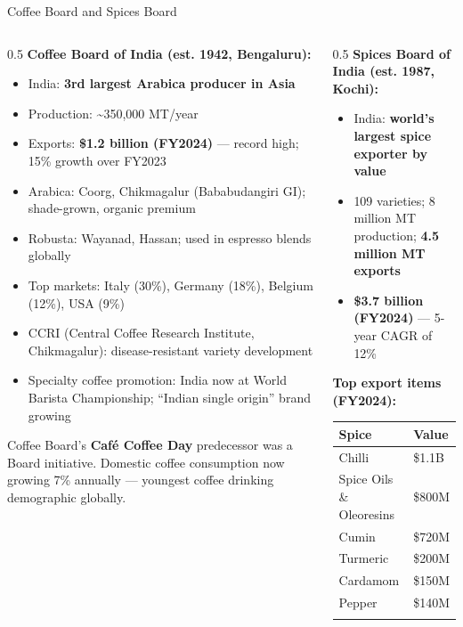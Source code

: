 \documentclass[
  ignorenonframetext,
  aspectratio=169,
]{beamer}
\makeatletter
\providecommand{\tightlist}{%
  \setlength{\itemsep}{0pt}\setlength{\parskip}{0pt}}
\let\quarto@originallabel\label
\DeclareRobustCommand*{\label}[1]{\quarto@originallabel{#1}}
\makeatother
\begin{document}
\begin{frame}{Coffee Board and Spices Board}
\label{coffee-board-and-spices-board}
\begin{columns}[T]
\begin{column}{0.5\linewidth}
\textbf{Coffee Board of India (est. 1942, Bengaluru):}

\begin{itemize}
\tightlist
\item
  India: \textbf{3rd largest Arabica producer in Asia}
\item
  Production: \textasciitilde350,000 MT/year
\item
  Exports: \textbf{\$1.2 billion (FY2024)} --- record high; 15\% growth
  over FY2023
\item
  {Arabica}: Coorg, Chikmagalur (Bababudangiri GI); shade-grown, organic
  premium
\item
  {Robusta}: Wayanad, Hassan; used in espresso blends globally
\item
  Top markets: Italy (30\%), Germany (18\%), Belgium (12\%), USA (9\%)
\item
  CCRI (Central Coffee Research Institute, Chikmagalur):
  disease-resistant variety development
\item
  Specialty coffee promotion: India now at World Barista Championship;
  ``Indian single origin'' brand growing
\end{itemize}

Coffee Board's \textbf{Café Coffee Day} predecessor was a Board
initiative. Domestic coffee consumption now growing 7\% annually ---
youngest coffee drinking demographic globally.
\end{column}

\begin{column}{0.5\linewidth}
\textbf{Spices Board of India (est. 1987, Kochi):}

\begin{itemize}
\tightlist
\item
  India: \textbf{world's largest spice exporter by value}
\item
  109 varieties; 8 million MT production; \textbf{4.5 million MT
  exports}
\item
  \textbf{\$3.7 billion (FY2024)} --- 5-year CAGR of 12\%
\end{itemize}

\textbf{Top export items (FY2024):}

\begin{longtable}[]{@{}ll@{}}
\toprule\noalign{}
Spice & Value \\
\midrule\noalign{}
\endhead
Chilli & \$1.1B \\
Spice Oils \& Oleoresins & \$800M \\
Cumin & \$720M \\
Turmeric & \$200M \\
Cardamom & \$150M \\
Pepper & \$140M \\
\bottomrule\noalign{}
\end{longtable}


\end{column}
\end{columns}
\end{frame}
\end{document}
